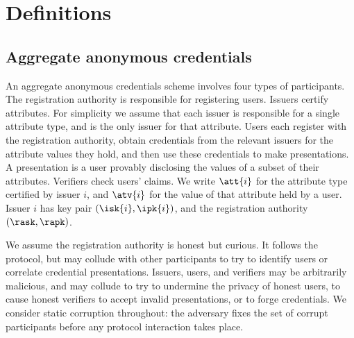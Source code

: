 \section{Definitions}\label{sec:agg-creds-definitions}

\subsection{Aggregate anonymous credentials}

An aggregate anonymous credentials scheme involves four types of participants.
The registration authority is responsible for registering users. Issuers certify
attributes. For simplicity we assume that each issuer is responsible for a
single attribute type, and is the only issuer for that attribute. Users each
register with the registration authority, obtain credentials from the relevant
issuers for the attribute values they hold, and then use these credentials to
make presentations. A presentation is a user provably disclosing the values of a
subset of their attributes. Verifiers check users' claims. We write $\att{i}$ for
the attribute type certified by issuer $i$, and $\atv{i}$ for the value of that
attribute held by a user. Issuer $i$ has key pair $(\isk{i}, \ipk{i})$, and the
registration authority $(\rask, \rapk)$.

We assume the registration authority is honest but curious. It follows the
protocol, but may collude with other participants to try to identify users or
correlate credential presentations. Issuers, users, and verifiers may be
arbitrarily malicious, and may collude to try to undermine the privacy of honest
users, to cause honest verifiers to accept invalid presentations, or to forge
credentials.  We consider static corruption throughout: the adversary fixes the
set of corrupt participants before any protocol interaction takes place.

